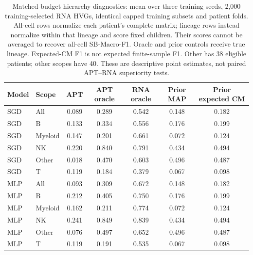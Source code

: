 \begin{table}[H]
\centering\small
\begin{tabular}{llccccc}
\toprule
Model & Scope & APT & APT oracle & RNA oracle & Prior MAP & Prior expected CM \\
\midrule
SGD & All & 0.089 & 0.289 & 0.542 & 0.148 & 0.182 \\
SGD & B & 0.133 & 0.334 & 0.556 & 0.176 & 0.199 \\
SGD & Myeloid & 0.147 & 0.201 & 0.661 & 0.072 & 0.124 \\
SGD & NK & 0.220 & 0.840 & 0.791 & 0.434 & 0.494 \\
SGD & Other & 0.018 & 0.470 & 0.603 & 0.496 & 0.487 \\
SGD & T & 0.119 & 0.184 & 0.379 & 0.067 & 0.098 \\
MLP & All & 0.093 & 0.309 & 0.672 & 0.148 & 0.182 \\
MLP & B & 0.212 & 0.405 & 0.750 & 0.176 & 0.199 \\
MLP & Myeloid & 0.162 & 0.211 & 0.774 & 0.072 & 0.124 \\
MLP & NK & 0.241 & 0.849 & 0.839 & 0.434 & 0.494 \\
MLP & Other & 0.076 & 0.497 & 0.652 & 0.496 & 0.487 \\
MLP & T & 0.119 & 0.191 & 0.535 & 0.067 & 0.098 \\
\bottomrule
\end{tabular}
\caption{Matched-budget hierarchy diagnostics: mean over three training seeds,
2,000 training-selected RNA HVGs, identical capped training subsets and patient
folds. All-cell rows normalize each patient's complete matrix; lineage rows
instead normalize within that lineage and score fixed children. Their scores
cannot be averaged to recover all-cell SB-Macro-F1.
Oracle and prior controls receive true lineage. Expected-CM F1 is not
expected finite-sample F1. Other has 38 eligible patients; other scopes have 40.
These are descriptive point estimates, not paired APT--RNA superiority tests.}
\label{tab:matched_identity}
\end{table}
